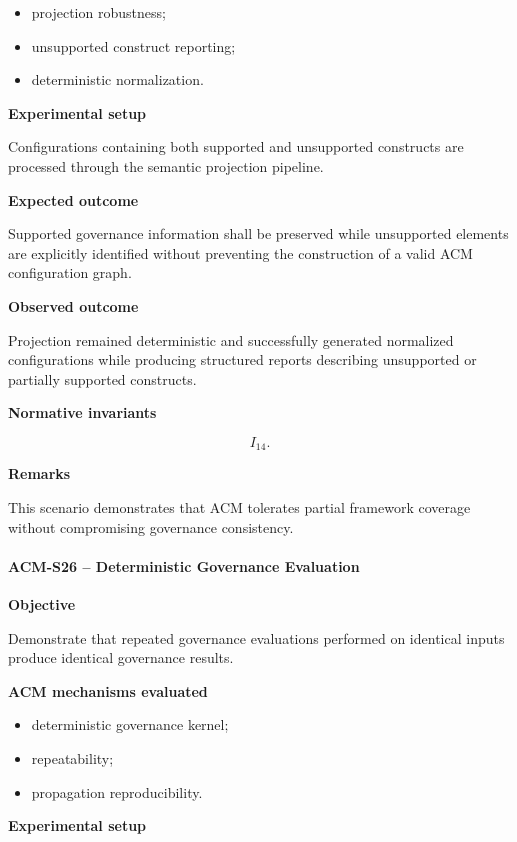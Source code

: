 \documentclass[10pt]{article}
\begin{document}
\begin{itemize}
    \item projection robustness;
    \item unsupported construct reporting;
    \item deterministic normalization.
\end{itemize}

\textbf{Experimental setup}

Configurations containing both supported and unsupported constructs are
processed through the semantic projection pipeline.

\textbf{Expected outcome}

Supported governance information shall be preserved while unsupported elements
are explicitly identified without preventing the construction of a valid ACM
configuration graph.

\textbf{Observed outcome}

Projection remained deterministic and successfully generated normalized
configurations while producing structured reports describing unsupported or
partially supported constructs.

\textbf{Normative invariants}

\[
I_{14}.
\]

\textbf{Remarks}

This scenario demonstrates that ACM tolerates partial framework coverage
without compromising governance consistency.

\paragraph{ACM-S26 -- Deterministic Governance Evaluation}

\textbf{Objective}

Demonstrate that repeated governance evaluations performed on identical inputs
produce identical governance results.

\textbf{ACM mechanisms evaluated}

\begin{itemize}
    \item deterministic governance kernel;
    \item repeatability;
    \item propagation reproducibility.
\end{itemize}

\textbf{Experimental setup}
\end{document}
